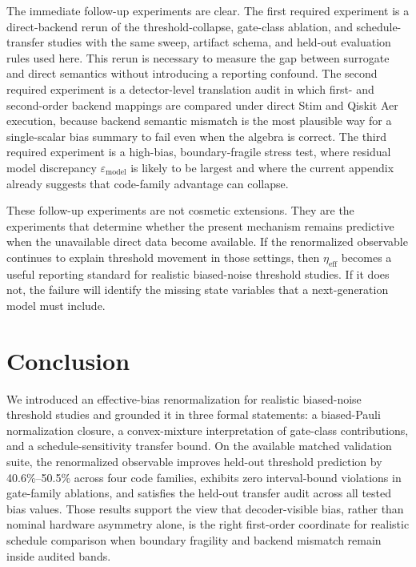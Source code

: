 \documentclass{article} %
\begin{document}
The immediate follow-up experiments are clear. The first required experiment is a direct-backend rerun of the threshold-collapse, gate-class ablation, and schedule-transfer studies with the same sweep, artifact schema, and held-out evaluation rules used here. This rerun is necessary to measure the gap between surrogate and direct semantics without introducing a reporting confound. The second required experiment is a detector-level translation audit in which first- and second-order backend mappings are compared under direct Stim and Qiskit Aer execution, because backend semantic mismatch is the most plausible way for a single-scalar bias summary to fail even when the algebra is correct. The third required experiment is a high-bias, boundary-fragile stress test, where residual model discrepancy $\varepsilon_{\mathrm{model}}$ is likely to be largest and where the current appendix already suggests that code-family advantage can collapse.

These follow-up experiments are not cosmetic extensions. They are the experiments that determine whether the present mechanism remains predictive when the unavailable direct data become available. If the renormalized observable continues to explain threshold movement in those settings, then $\eta_{\mathrm{eff}}$ becomes a useful reporting standard for realistic biased-noise threshold studies. If it does not, the failure will identify the missing state variables that a next-generation model must include.

\section{Conclusion}
\label{sec:conclusion}

We introduced an effective-bias renormalization for realistic biased-noise threshold studies and grounded it in three formal statements: a biased-Pauli normalization closure, a convex-mixture interpretation of gate-class contributions, and a schedule-sensitivity transfer bound. On the available matched validation suite, the renormalized observable improves held-out threshold prediction by 40.6\%--50.5\% across four code families, exhibits zero interval-bound violations in gate-family ablations, and satisfies the held-out transfer audit across all tested bias values. Those results support the view that decoder-visible bias, rather than nominal hardware asymmetry alone, is the right first-order coordinate for realistic schedule comparison when boundary fragility and backend mismatch remain inside audited bands.
\end{document}

